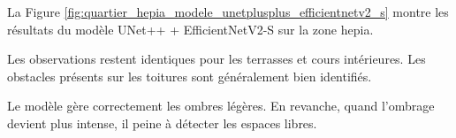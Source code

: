 
\newpage
La Figure \ref{fig:quartier_hepia_modele_unetplusplus_efficientnetv2_s} montre les résultats du modèle UNet++ + EfficientNetV2-S sur la zone \acrshort{hepia}.

Les observations restent identiques pour les terrasses et cours intérieures. Les obstacles présents sur les toitures sont généralement bien identifiés.

Le modèle gère correctement les ombres légères. En revanche, quand l'ombrage devient plus intense, il peine à détecter les espaces libres.

\begin{figure}[H]
\centering
{}
\end{figure}
